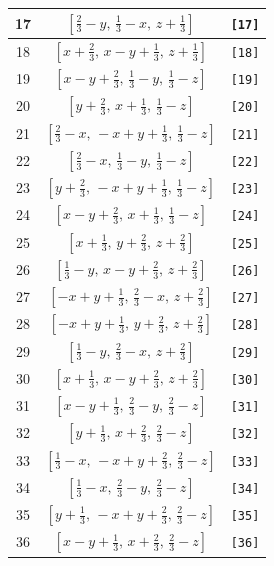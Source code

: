 \documentclass[fleqn,8pt]{jsarticle}
\begin{document}
\begin{longtable}{ccc}
17 & $\left[ \frac{2}{3} - y,\, \frac{1}{3} - x,\, z + \frac{1}{3} \right]$ & {\tt [17]} \\ \hline
18 & $\left[ x + \frac{2}{3},\, x - y + \frac{1}{3},\, z + \frac{1}{3} \right]$ & {\tt [18]} \\ \hline
19 & $\left[ x - y + \frac{2}{3},\, \frac{1}{3} - y,\, \frac{1}{3} - z \right]$ & {\tt [19]} \\ \hline
20 & $\left[ y + \frac{2}{3},\, x + \frac{1}{3},\, \frac{1}{3} - z \right]$ & {\tt [20]} \\ \hline
21 & $\left[ \frac{2}{3} - x,\, - x + y + \frac{1}{3},\, \frac{1}{3} - z \right]$ & {\tt [21]} \\ \hline
22 & $\left[ \frac{2}{3} - x,\, \frac{1}{3} - y,\, \frac{1}{3} - z \right]$ & {\tt [22]} \\ \hline
23 & $\left[ y + \frac{2}{3},\, - x + y + \frac{1}{3},\, \frac{1}{3} - z \right]$ & {\tt [23]} \\ \hline
24 & $\left[ x - y + \frac{2}{3},\, x + \frac{1}{3},\, \frac{1}{3} - z \right]$ & {\tt [24]} \\ \hline
25 & $\left[ x + \frac{1}{3},\, y + \frac{2}{3},\, z + \frac{2}{3} \right]$ & {\tt [25]} \\ \hline
26 & $\left[ \frac{1}{3} - y,\, x - y + \frac{2}{3},\, z + \frac{2}{3} \right]$ & {\tt [26]} \\ \hline
27 & $\left[ - x + y + \frac{1}{3},\, \frac{2}{3} - x,\, z + \frac{2}{3} \right]$ & {\tt [27]} \\ \hline
28 & $\left[ - x + y + \frac{1}{3},\, y + \frac{2}{3},\, z + \frac{2}{3} \right]$ & {\tt [28]} \\ \hline
29 & $\left[ \frac{1}{3} - y,\, \frac{2}{3} - x,\, z + \frac{2}{3} \right]$ & {\tt [29]} \\ \hline
30 & $\left[ x + \frac{1}{3},\, x - y + \frac{2}{3},\, z + \frac{2}{3} \right]$ & {\tt [30]} \\ \hline
31 & $\left[ x - y + \frac{1}{3},\, \frac{2}{3} - y,\, \frac{2}{3} - z \right]$ & {\tt [31]} \\ \hline
32 & $\left[ y + \frac{1}{3},\, x + \frac{2}{3},\, \frac{2}{3} - z \right]$ & {\tt [32]} \\ \hline
33 & $\left[ \frac{1}{3} - x,\, - x + y + \frac{2}{3},\, \frac{2}{3} - z \right]$ & {\tt [33]} \\ \hline
34 & $\left[ \frac{1}{3} - x,\, \frac{2}{3} - y,\, \frac{2}{3} - z \right]$ & {\tt [34]} \\ \hline
35 & $\left[ y + \frac{1}{3},\, - x + y + \frac{2}{3},\, \frac{2}{3} - z \right]$ & {\tt [35]} \\ \hline
36 & $\left[ x - y + \frac{1}{3},\, x + \frac{2}{3},\, \frac{2}{3} - z \right]$ & {\tt [36]} \\
\end{longtable}
\end{document}

